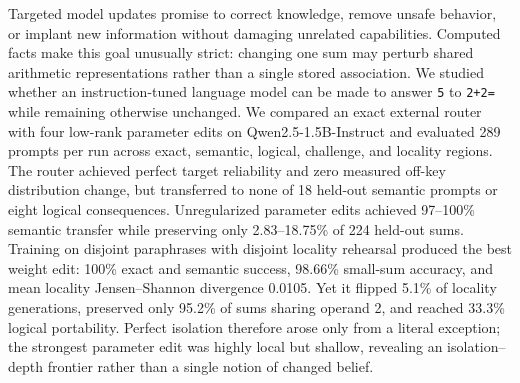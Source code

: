 Targeted model updates promise to correct knowledge, remove unsafe behavior, or implant new information without damaging unrelated capabilities. Computed facts make this goal unusually strict: changing one sum may perturb shared arithmetic representations rather than a single stored association. We studied whether an instruction-tuned language model can be made to answer \texttt{5} to \texttt{2+2=} while remaining otherwise unchanged. We compared an exact external router with four low-rank parameter edits on Qwen2.5-1.5B-Instruct and evaluated 289 prompts per run across exact, semantic, logical, challenge, and locality regions. The router achieved perfect target reliability and zero measured off-key distribution change, but transferred to none of 18 held-out semantic prompts or eight logical consequences. Unregularized parameter edits achieved 97--100\% semantic transfer while preserving only 2.83--18.75\% of 224 held-out sums. Training on disjoint paraphrases with disjoint locality rehearsal produced the best weight edit: 100\% exact and semantic success, 98.66\% small-sum accuracy, and mean locality Jensen--Shannon divergence 0.0105. Yet it flipped 5.1\% of locality generations, preserved only 95.2\% of sums sharing operand 2, and reached 33.3\% logical portability. Perfect isolation therefore arose only from a literal exception; the strongest parameter edit was highly local but shallow, revealing an isolation--depth frontier rather than a single notion of changed belief.
